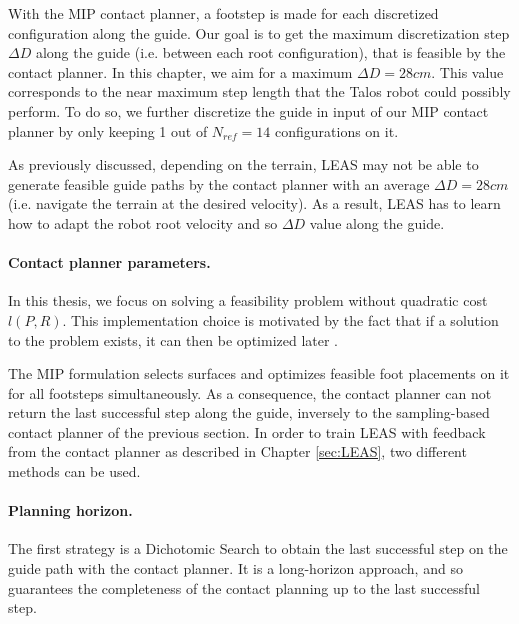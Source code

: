With the MIP contact planner, a footstep is made for each discretized configuration along the guide.
Our goal is to get the maximum discretization step $\Delta D$ along the guide (i.e. between each root configuration), that is feasible by the contact planner.
In this chapter, we aim for a maximum $\Delta D=28cm$. 
This value corresponds to the near maximum step length that the Talos robot could possibly perform.
To do so, we further discretize the guide in input of our MIP contact planner by only keeping 1 out of $N_{ref}=14$ configurations on it.

As previously discussed, depending on the terrain, LEAS may not be able to generate feasible guide paths by the contact planner with an average $\Delta D=28cm$ (i.e. navigate the terrain at the desired velocity).
As a result, LEAS has to learn how to adapt the robot root velocity and so $\Delta D$ value along the guide.


\paragraph{Contact planner parameters.}
In this thesis, we focus on solving a feasibility problem without quadratic cost $l(P,R)$.
This implementation choice is motivated by the fact that if a solution to the problem exists, it can then be optimized later \cite{sl1m_v2}.

The MIP formulation selects surfaces and optimizes feasible foot placements on it for all footsteps simultaneously.
As a consequence, the contact planner can not return the last successful step along the guide, inversely to the sampling-based contact planner of the previous section.
In order to train LEAS with feedback from the contact planner as described in Chapter \ref{sec:LEAS}, two different methods can be used.

\paragraph{Planning horizon.}
The first strategy is a Dichotomic Search to obtain the last successful step on the guide path with the contact planner. 
It is a long-horizon approach, and so guarantees the completeness of the contact planning up to the last successful step. %

